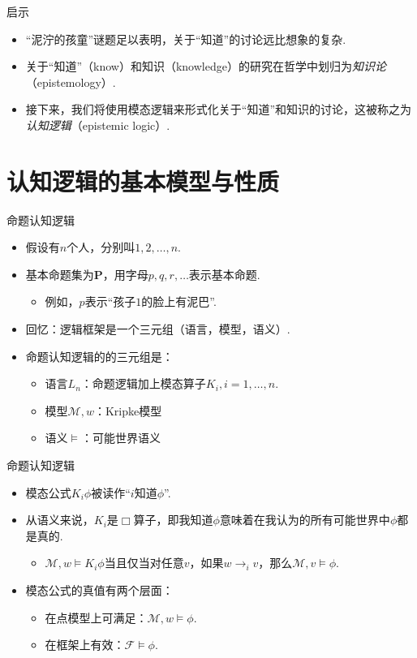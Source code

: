 \begin{frame}{启示}
\begin{itemize}
    \item “泥泞的孩童”谜题足以表明，关于“知道”的讨论远比想象的复杂.
    \item 关于“知道”（know）和知识（knowledge）的研究在哲学中划归为\emph{知识论}（epistemology）.
    \item 接下来，我们将使用模态逻辑来形式化关于“知道”和知识的讨论，这被称之为\emph{认知逻辑}（epistemic logic）.
\end{itemize}
\end{frame}

\section{认知逻辑的基本模型与性质}
\begin{frame}{命题认知逻辑}
\begin{itemize}
    \item 假设有$n$个人，分别叫$1,2,\dots,n$.
    \item 基本命题集为$\mathbf P$，用字母$p,q,r,\dots$表示基本命题.
    \begin{itemize}
        \item 例如，$p$表示“孩子$1$的脸上有泥巴”.
    \end{itemize}
    \item 回忆：逻辑框架是一个三元组（语言，模型，语义）.
    \item 命题认知逻辑的的三元组是：
    \begin{itemize}
        \item 语言$L_n$：命题逻辑加上模态算子$K_i,i=1,\dots,n$.
        \item 模型$\mathcal M,w$：Kripke模型
        \item 语义$\vDash$：可能世界语义
    \end{itemize}
\end{itemize}
\end{frame}
\begin{frame}{命题认知逻辑}
\begin{itemize}
    \item 模态公式$K_i\phi$被读作“$i$知道$\phi$”.
    \item 从语义来说，$K_i$是$\Box$算子，即我知道$\phi$意味着在我认为的所有可能世界中$\phi$都是真的.
    \begin{itemize}
        \item $\mathcal M,w\vDash K_i\phi$当且仅当对任意$v$，如果$w\to_i v$，那么$\mathcal M,v\vDash\phi$.
    \end{itemize}
    \item 模态公式的真值有两个层面：
    \begin{itemize}
        \item 在点模型上可满足：$\mathcal M,w\vDash\phi$.
        \item 在框架上有效：$\mathcal F\vDash\phi$.
    \end{itemize}
\end{itemize}
\end{frame}
